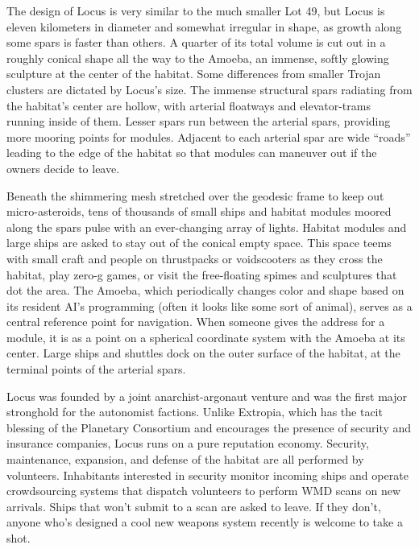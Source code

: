 The design of Locus is very similar to the much smaller Lot 49, but Locus is eleven kilometers in diameter and somewhat irregular in shape, as growth along some spars is faster than others. A quarter of its total volume is cut out in a roughly conical shape all the way to the Amoeba, an immense, softly glowing sculpture at the center of the habitat. Some differences from smaller Trojan clusters are dictated by Locus's size. The immense structural spars radiating from the habitat's center are hollow, with arterial floatways and elevator-trams running inside of them. Lesser spars run between the arterial spars, providing more mooring points for modules. Adjacent to each arterial spar are wide “roads” leading to the edge of the habitat so that modules can maneuver out if the owners decide to leave. 

Beneath the shimmering mesh stretched over the geodesic frame to keep out micro-asteroids, tens of thousands of small ships and habitat modules moored along the spars pulse with an ever-changing array of lights. Habitat modules and large ships are asked to stay out of the conical empty space. This space teems with small craft and people on thrustpacks or voidscooters as they cross the habitat, play zero-g games, or visit the free-floating spimes and sculptures that dot the area. The Amoeba, which periodically changes color and shape based on its resident AI's programming (often it looks like some sort of animal), serves as a central reference point for navigation. When someone gives the address for a module, it is as a point on a spherical coordinate system with the Amoeba at its center. Large ships and shuttles dock on the outer surface of the habitat, at the terminal points of the arterial spars. 

Locus was founded by a joint anarchist-argonaut venture and was the first major stronghold for the autonomist factions. Unlike Extropia, which has the tacit blessing of the Planetary Consortium and encourages the presence of security and insurance companies, Locus runs on a pure reputation economy. Security, maintenance, expansion, and defense of the habitat are all performed by volunteers. Inhabitants interested in security monitor incoming ships and operate crowdsourcing systems that dispatch volunteers to perform WMD scans on new arrivals. Ships that won't submit to a scan are asked to leave. If they don't, anyone who's designed a cool new weapons system recently is welcome to take a shot. 

